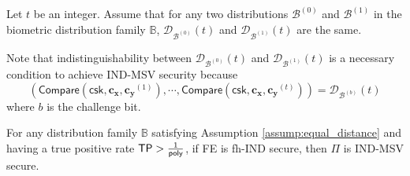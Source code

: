\begin{assumption}
\label{assump:equal_distance}
Let $t$ be an integer. Assume that for any two distributions $\mathcal{B}^{(0)}$ and $\mathcal{B}^{(1)}$ in the biometric distribution family $\mathbb{B}$, $\mathcal{D}_{ \mathcal{B}^{(0)} }(t)$ and $\mathcal{D}_{ \mathcal{B}^{(1)} }(t)$ are the same. 

\end{assumption}

Note that indistinguishability between $\mathcal{D}_{ \mathcal{B}^{(0)} }(t)$ and $\mathcal{D}_{ \mathcal{B}^{(1)} }(t)$ is a necessary condition to achieve IND-MSV security because
\[
	\left( \textsf{Compare}(\textsf{csk}, \mathbf{c_x}, \mathbf{c_y}^{(1)}), \cdots, \textsf{Compare}(\textsf{csk}, \mathbf{c_x}, \mathbf{c_y}^{(t)}) \right) = \mathcal{D}_{ \mathcal{B}^{(b)} }(t)
\]
where $b$ is the challenge bit.


\begin{theorem}
\label{thm:fh-IPFE:ind-ind-msv}
For any distribution family $\mathbb{B}$ satisfying Assumption \ref{assump:equal_distance} and having a true positive rate $\textsf{TP} > \frac{1}{\mathsf{poly}}$, if \textsf{FE} is fh-IND secure, then $\Pi$ is IND-MSV secure.

\end{theorem}




